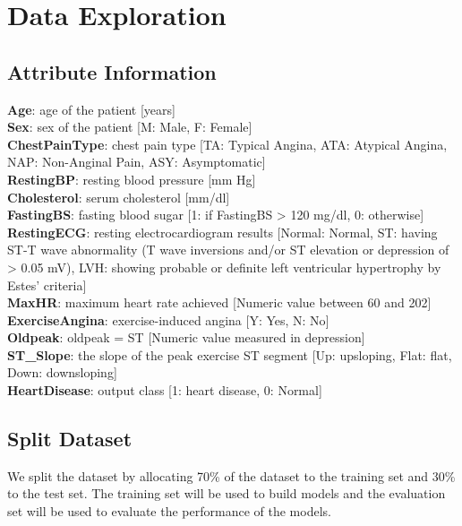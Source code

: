 \documentclass[
]{article}
\begin{document}
\section{Data Exploration}\label{data-exploration}

\subsection{Attribute Information}\label{attribute-information}

\textbf{Age}: age of the patient {[}years{]}\\
\textbf{Sex}: sex of the patient {[}M: Male, F: Female{]}\\
\textbf{ChestPainType}: chest pain type {[}TA: Typical Angina, ATA:
Atypical Angina, NAP: Non-Anginal Pain, ASY: Asymptomatic{]}\\
\textbf{RestingBP}: resting blood pressure {[}mm Hg{]}\\
\textbf{Cholesterol}: serum cholesterol {[}mm/dl{]}\\
\textbf{FastingBS}: fasting blood sugar {[}1: if FastingBS
\textgreater{} 120 mg/dl, 0: otherwise{]}\\
\textbf{RestingECG}: resting electrocardiogram results {[}Normal:
Normal, ST: having ST-T wave abnormality (T wave inversions and/or ST
elevation or depression of \textgreater{} 0.05 mV), LVH: showing
probable or definite left ventricular hypertrophy by Estes'
criteria{]}\\
\textbf{MaxHR}: maximum heart rate achieved {[}Numeric value between 60
and 202{]}\\
\textbf{ExerciseAngina}: exercise-induced angina {[}Y: Yes, N: No{]}\\
\textbf{Oldpeak}: oldpeak = ST {[}Numeric value measured in
depression{]}\\
\textbf{ST\_Slope}: the slope of the peak exercise ST segment {[}Up:
upsloping, Flat: flat, Down: downsloping{]}\\
\textbf{HeartDisease}: output class {[}1: heart disease, 0: Normal{]}

\subsection{Split Dataset}\label{split-dataset}

We split the dataset by allocating 70\% of the dataset to the training
set and 30\% to the test set. The training set will be used to build
models and the evaluation set will be used to evaluate the performance
of the models.
\end{document}
